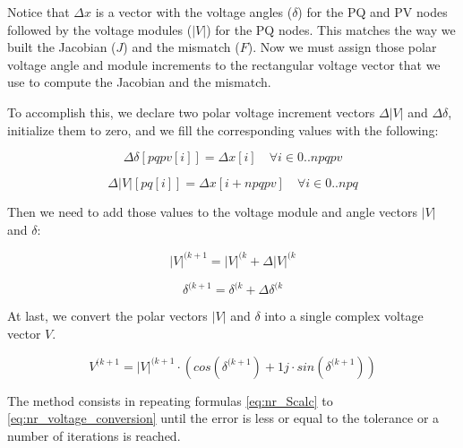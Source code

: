 \documentclass[a4paper,twoside]{tufte-book}
\begin{document}
Notice that $\Delta x$ is a vector with the voltage angles ($\delta$) for the PQ and PV nodes followed by the voltage modules ($|V|$) for the PQ nodes. This matches the way we built the Jacobian ($J$) and the mismatch ($F$). Now we must assign those polar voltage angle and module increments to the rectangular voltage vector that we use to compute the Jacobian and the mismatch.

To accomplish this, we declare two polar voltage increment vectors $\Delta |V|$ and $\Delta \delta$, initialize them to zero, and we fill the corresponding values with the following:

\begin{equation}
\Delta \delta[pqpv[i]] = \Delta x[i]  \quad \forall i \in {0..npqpv}
\label{eq:nr_dd1}
\end{equation}

\begin{equation}
\Delta  |V|[pq[i]] = \Delta x[i+npqpv]  \quad \forall i \in {0..npq}
\end{equation}

Then we need to add those values to the voltage module and angle vectors $|V|$ and $\delta$:


\begin{equation}
|V|^{(k+1} = |V|^{(k} + \Delta |V|^{(k}
\end{equation}

\begin{equation}
\delta^{(k+1} = \delta^{(k} + \Delta \delta^{(k}
\end{equation}

At last, we convert the polar vectors  $|V|$ and $\delta$ into a single complex voltage vector $V$.

\begin{equation}
V^{(k+1} = |V|^{(k+1} \cdot \left( cos(\delta^{(k+1}) + 1j \cdot sin(\delta^{(k+1})\right)
\label{eq:nr_voltage_conversion}
\end{equation}

The method consists in repeating formulas \ref{eq:nr_Scalc} to \ref{eq:nr_voltage_conversion} until the error is less or equal to the tolerance or a number of iterations is reached.
\end{document}
